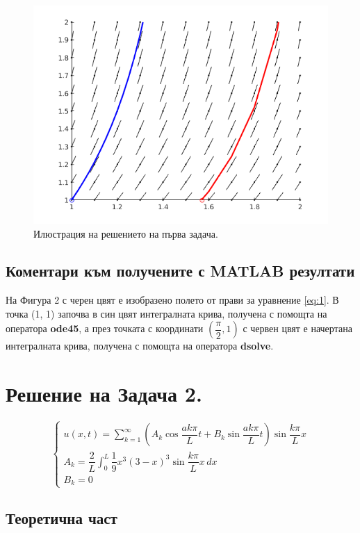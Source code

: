 \documentclass[14pt]{extarticle}
\let\frac\dfrac
\begin{document}
\begin{figure}[H]
	\centering
	\includegraphics{images/task1}
	\caption{Илюстрация на решението на първа задача.}
\end{figure}

\subsection{Коментари към получените с MATLAB резултати}

На Фигура 2 с черен цвят е изобразено полето от прави за уравнение \eqref{eq:1}.
В точка (1, 1) започва в син цвят интегралната крива, получена с помощта на оператора \textbf{ode45}, а през точката с координати $\left(\frac{\pi}{2},1\right)$ с червен цвят е начертана интегралната крива, получена с помощта на оператора \textbf{dsolve}.

\section{Решение на Задача 2.}

\[
\left\{
	\begin{array}{ll}
		\displaystyle u(x,t) = \sum_{k=1}^{\infty} \left( A_k\cos\frac{ak\pi}{L}t + B_k\sin\frac{ak\pi}{L}t \right) \sin\frac{k\pi}{L}x \\
		\displaystyle A_k = \frac{2}{L} \int_0^L \frac{1}{9}x^3(3-x)^3 \sin\frac{k\pi}{L}x \, dx \\
		B_k = 0
	\end{array}
\right.
\]

\subsection{Теоретична част}
\end{document}
